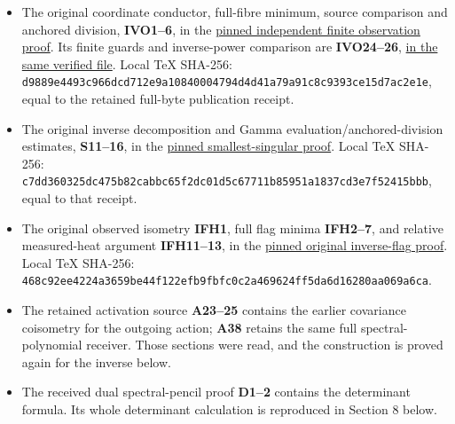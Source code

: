 \documentclass[11pt]{article}
\begin{document}
\begin{itemize}
\tightlist
\item
  The original coordinate conductor, full-fibre minimum, source comparison and anchored division, \textbf{IVO1--6}, in the \href{https://github.com/KokunoYumeto/zeta-function-research-reader/blob/edd4008690952fb8568a01744e49ad7e180401e9/workbenches/splitzero-tandem/continuations/20260921-original-observation/INDEPENDENT_FINITE_OBSERVATION.tex\#L7}{pinned independent finite observation proof}. Its finite guards and inverse-power comparison are \textbf{IVO24--26}, \href{https://github.com/KokunoYumeto/zeta-function-research-reader/blob/edd4008690952fb8568a01744e49ad7e180401e9/workbenches/splitzero-tandem/continuations/20260921-original-observation/INDEPENDENT_FINITE_OBSERVATION.tex\#L258}{in the same verified file}. Local TeX SHA-256: \nolinkurl{d9889e4493c966dcd712e9a10840004794d4d41a79a91c8c9393ce15d7ac2e1e}, equal to the retained full-byte publication receipt.
\item
  The original inverse decomposition and Gamma evaluation/anchored-division estimates, \textbf{S11--16}, in the \href{https://github.com/KokunoYumeto/zeta-function-research-reader/blob/edd4008690952fb8568a01744e49ad7e180401e9/workbenches/splitzero-tandem/continuations/20260921-original-observation/NATIVE_SMALLEST_SINGULAR_PROOF.tex\#L64}{pinned smallest-singular proof}. Local TeX SHA-256: \nolinkurl{c7dd360325dc475b82cabbc65f2dc01d5c67711b85951a1837cd3e7f52415bbb}, equal to that receipt.
\item
  The original observed isometry \textbf{IFH1}, full flag minima \textbf{IFH2--7}, and relative measured-heat argument \textbf{IFH11--13}, in the \href{https://github.com/KokunoYumeto/zeta-function-research-reader/blob/edd4008690952fb8568a01744e49ad7e180401e9/workbenches/splitzero-tandem/continuations/20260921-original-observation/INVERSE_FLAG_AND_RELATIVE_HEAT.tex\#L17}{pinned original inverse-flag proof}. Local TeX SHA-256: \nolinkurl{468c92ee4224a3659be44f122efb9fbfc0c2a469624ff5da6d16280aa069a6ca}.
\item
  The retained activation source \textbf{A23--25} contains the earlier covariance coisometry for the outgoing action; \textbf{A38} retains the same full spectral-polynomial receiver. Those sections were read, and the construction is proved again for the inverse below.
\item
  The received dual spectral-pencil proof \textbf{D1--2} contains the determinant formula. Its whole determinant calculation is reproduced in Section 8 below.
\end{itemize}
\end{document}
